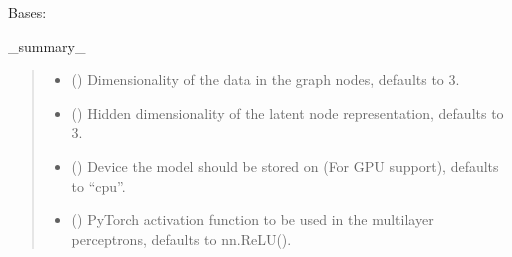 \documentclass[a4paper,10pt,english]{report}
\begin{document}
\begin{fulllineitems}
\label{\detokenize{NNucleate:NNucleate.models.GNNCV}}
\pysigstartsignatures
{}
\pysigstopsignatures
\sphinxAtStartPar
Bases: 

\sphinxAtStartPar
\_summary\_
\begin{quote}\begin{description}
\begin{itemize}
\item {} 
\sphinxAtStartPar
{} (\sphinxstyleliteralemphasis{\sphinxupquote{, }}) \textendash{} Dimensionality of the data in the graph nodes, defaults to 3.

\item {} 
\sphinxAtStartPar
{} (\sphinxstyleliteralemphasis{\sphinxupquote{, }}) \textendash{} Hidden dimensionality of the latent node representation, defaults to 3.

\item {} 
\sphinxAtStartPar
{} (\sphinxstyleliteralemphasis{\sphinxupquote{, }}) \textendash{} Device the model should be stored on (For GPU support), defaults to “cpu”.

\item {} 
\sphinxAtStartPar
{} (\sphinxstyleliteralemphasis{\sphinxupquote{, }}) \textendash{} PyTorch activation function to be used in the multi\sphinxhyphen{}layer perceptrons, defaults to nn.ReLU().


\end{itemize}
\end{description}
\end{quote}
\end{fulllineitems}
\end{document}
